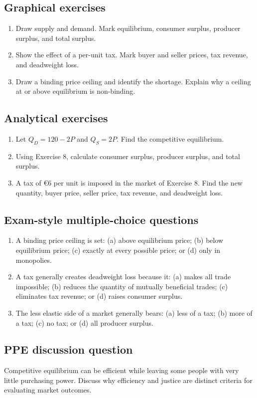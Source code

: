 \subsection*{Graphical exercises}
\begin{enumerate}[resume,label=\arabic*.]
  \item Draw supply and demand. Mark equilibrium, consumer surplus, producer surplus, and total surplus.
  \item Show the effect of a per-unit tax. Mark buyer and seller prices, tax revenue, and deadweight loss.
  \item Draw a binding price ceiling and identify the shortage. Explain why a ceiling at or above equilibrium is non-binding.
\end{enumerate}

\subsection*{Analytical exercises}
\begin{enumerate}[resume,label=\arabic*.]
  \item Let $Q_D=120-2P$ and $Q_S=2P$. Find the competitive equilibrium.
  \item Using Exercise 8, calculate consumer surplus, producer surplus, and total surplus.
  \item A tax of \euro6 per unit is imposed in the market of Exercise 8. Find the new quantity, buyer price, seller price, tax revenue, and deadweight loss.
\end{enumerate}

\subsection*{Exam-style multiple-choice questions}
\begin{enumerate}[resume,label=\arabic*.]
  \item A binding price ceiling is set: (a) above equilibrium price; (b) below equilibrium price; (c) exactly at every possible price; or (d) only in monopolies.
  \item A tax generally creates deadweight loss because it: (a) makes all trade impossible; (b) reduces the quantity of mutually beneficial trades; (c) eliminates tax revenue; or (d) raises consumer surplus.
  \item The less elastic side of a market generally bears: (a) less of a tax; (b) more of a tax; (c) no tax; or (d) all producer surplus.
\end{enumerate}

\subsection*{PPE discussion question}

\noindent Competitive equilibrium can be efficient while leaving some people
with very little purchasing power. Discuss why efficiency and justice are
distinct criteria for evaluating market outcomes.
